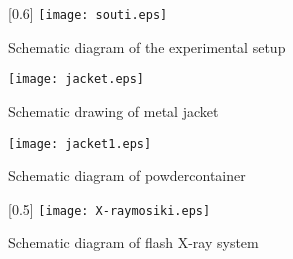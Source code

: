

\begin{figure}[p]
\begin{center}
\scalebox{0.6}[0.6]
{\texttt{[image: souti.eps]}}
\end{center}
\caption{Schematic diagram of the experimental setup}
\label{fig:装置図}
\end{figure}




\begin{figure}[p]
\begin{center}

\texttt{[image: jacket.eps]}
\end{center}

\caption{Schematic drawing of metal jacket}
\label{fig:ジャケット}
\end{figure}

\begin{figure}[p]
\begin{center}

\texttt{[image: jacket1.eps]}

\end{center}

\caption{Schematic diagram of powdercontainer}
\label{fig:ジャケット断面}
\end{figure}




\begin{figure}
\begin{center}
\scalebox{0.5}[0.5]
{\texttt{[image: X-raymosiki.eps]}}
\end{center}


\caption{Schematic diagram of flash X-ray system}
\label{fig:X線模式図}
\end{figure}


